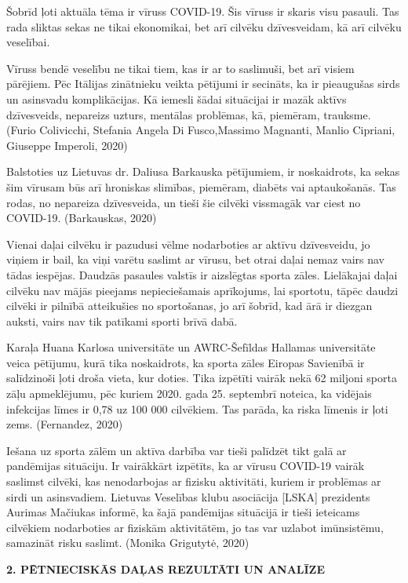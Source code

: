 \documentclass[12pt]{article}
\begin{document}
Šobrīd ļoti aktuāla tēma ir vīruss COVID-19. Šis vīruss ir skaris visu pasauli. Tas rada sliktas sekas ne tikai ekonomikai, bet arī cilvēku dzīvesveidam, kā arī cilvēku veselībai. \par
Vīruss bendē veselību ne tikai tiem, kas ir ar to saslimuši, bet arī visiem pārējiem. Pēc Itālijas zinātnieku veikta pētījumi ir secināts, ka ir pieaugušas sirds un asinsvadu komplikācijas. Kā iemesli šādai situācijai ir mazāk aktīvs dzīvesveids, nepareizs uzturs, mentālas problēmas, kā, piemēram, trauksme. (Furio Colivicchi, Stefania Angela Di Fusco,Massimo Magnanti, Manlio Cipriani, Giuseppe Imperoli, 2020)\par
Balstoties uz Lietuvas dr. Daliusa Barkauska pētījumiem, ir noskaidrots, ka sekas šim vīrusam būs arī hroniskas slimības, piemēram, diabēts vai aptaukošanās. Tas rodas, no nepareiza dzīvesveida, un tieši šie cilvēki vissmagāk var ciest no COVID-19. (Barkauskas, 2020) \par
Vienai daļai cilvēku ir pazudusi vēlme nodarboties ar aktīvu dzīvesveidu, jo viņiem ir bail, ka viņi varētu saslimt ar vīrusu, bet otrai daļai nemaz vairs nav tādas iespējas. Daudzās pasaules valstīs ir aizslēgtas sporta zāles. Lielākajai daļai cilvēku nav mājās pieejams nepieciešamais aprīkojums, lai sportotu, tāpēc daudzi cilvēki ir pilnībā atteikušies no sportošanas, jo arī šobrīd, kad ārā ir diezgan auksti, vairs nav tik patīkami sporti brīvā dabā. \par
Karaļa Huana Karlosa universitāte un AWRC-Šefīldas Hallamas universitāte veica pētījumu, kurā tika noskaidrots, ka sporta zāles Eiropas Savienībā ir salīdzinoši ļoti droša vieta, kur doties. Tika izpētīti vairāk nekā 62 miljoni sporta zāļu apmeklējumu, pēc kuriem 2020. gada 25. septembrī noteica, ka vidējais infekcijas līmes ir 0,78 uz 100 000 cilvēkiem. Tas parāda, ka riska līmenis ir ļoti zems. (Fernandez, 2020) \par
Iešana uz sporta zālēm un aktīva darbība var tieši palīdzēt tikt galā ar pandēmijas situāciju. Ir vairākkārt izpētīts, ka ar vīrusu COVID-19 vairāk saslimst cilvēki, kas nenodarbojas ar fizisku aktivitāti, kuriem ir problēmas ar sirdi un asinsvadiem.  
Lietuvas Veselības klubu asociācija [LSKA] prezidents Aurimas Mačiukas informē, ka šajā pandēmijas situācijā ir tieši ieteicams cilvēkiem nodarboties ar fiziskām aktivitātēm, jo tas var uzlabot imūnsistēmu, samazināt risku saslimt. 
  (Monika Grigutytė, 2020)

\newpage

\begin{center}
{\large \bf 2. PĒTNIECISKĀS DAĻAS REZULTĀTI UN ANALĪZE}
\end{center}
\end{document}
